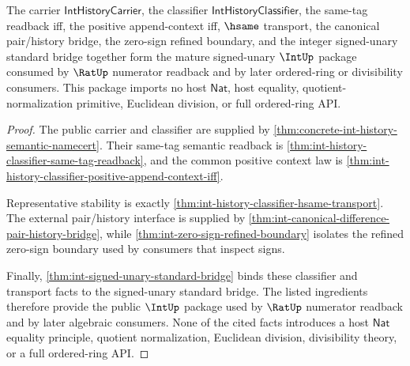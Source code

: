 \begin{theorem}
\label{thm:intup-mature-signed-unary-downstream-package}
The carrier $\mathsf{IntHistoryCarrier}$, the classifier
$\mathsf{IntHistoryClassifier}$, the same-tag readback iff, the positive
append-context iff, $\hsame$ transport, the canonical pair/history bridge, the
zero-sign refined boundary, and the integer signed-unary standard bridge
together form the mature signed-unary $\IntUp$ package consumed by $\RatUp$
numerator readback and by later ordered-ring or divisibility consumers. This
package imports no host $\mathsf{Nat}$, host equality,
quotient-normalization primitive, Euclidean division, or full ordered-ring API.
\end{theorem}
\begin{proof}
The public carrier and classifier are supplied by
\autoref{thm:concrete-int-history-semantic-namecert}. Their same-tag semantic
readback is \autoref{thm:int-history-classifier-same-tag-readback}, and the
common positive context law is
\autoref{thm:int-history-classifier-positive-append-context-iff}.

Representative stability is exactly
\autoref{thm:int-history-classifier-hsame-transport}. The external
pair/history interface is supplied by
\autoref{thm:int-canonical-difference-pair-history-bridge}, while
\autoref{thm:int-zero-sign-refined-boundary} isolates the refined zero-sign
boundary used by consumers that inspect signs.

Finally, \autoref{thm:int-signed-unary-standard-bridge} binds these classifier
and transport facts to the signed-unary standard bridge. The listed ingredients
therefore provide the public $\IntUp$ package used by $\RatUp$ numerator
readback and by later algebraic consumers. None of the cited facts introduces
a host $\mathsf{Nat}$ equality principle, quotient normalization, Euclidean
division, divisibility theory, or a full ordered-ring API.
\end{proof}
